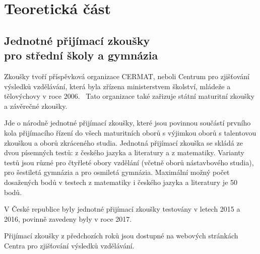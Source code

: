 \chapter{Teoretická část}


\section[Jednotné přijímací zkoušky pro střední školy a gymnázia]{Jednotné přijímací zkoušky\\pro střední školy a gymnázia}

Zkoušky tvoří příspěvková organizace CERMAT, neboli Centrum pro zjišťování výsledků vzdělávání, která byla zřízena ministerstvem školství, mládeže a tělovýchovy v roce 2006.~\cite{zakon_CERMAT} Tato organizace také zařizuje státní maturitní zkoušky a závěrečné zkoušky.~\cite{CERMAT_p_m}



Jde o národně jednotné přijímací zkoušky, které jsou povinnou součástí prvního kola přijímacího řízení do všech maturitních oborů s výjimkou oborů s talentovou zkouškou a oborů zkráceného studia.
Jednotná přijímací zkouška se skládá ze dvou písemných testů: z českého jazyka a literatury a z matematiky.
Varianty testů jsou různé pro čtyřleté obory vzdělání (včetně oborů nástavbového studia), pro šestiletá gymnázia a pro osmiletá gymnázia.
Maximální možný počet dosažených bodů v testech z matematiky i českého jazyka a literatury je 50 bodů.~\cite{CERMAT_co_to_je}

V České republice byly jednotné přijímací zkoušky testovány v letech 2015 a 2016, povinně zavedeny byly v roce 2017.~\cite{CERMAT_rocni_zprava}

Přijímací zkoušky z předchozích roků jsou dostupné na webových stránkách Centra pro zjišťování výsledků vzdělávání.~\cite{CERMAT_pdfka}


